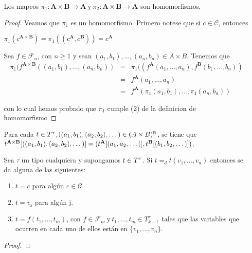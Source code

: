   \begin{lemma} \label{lemma_56}
    \PN Los mapeos $\pi_{1}: \mathbf{A} \times \mathbf{B} \rightarrow \mathbf{A} \ \text{y} \ \pi_{2}: \mathbf{A} \times
    \mathbf{B} \rightarrow \mathbf{A}$ son homomorfismos.
  \end{lemma}
  \begin{proof}
    Veamos que $\pi _{1}$ es un homomorfismo. Primero notese que si $c\in \mathcal{C}$, entonces

    $\displaystyle \pi _{1}(c^{\mathbf{A}\times \mathbf{B}})=\pi _{1}((c^{\mathbf{A}},c^{ \mathbf{B}}))=c^{\mathbf{A}} $

    Sea $f\in \mathcal{F}_{n}$, con $n\geq 1$ y sean $ (a_{1},b_{1}), \dotsc, (a_{n},b_{n})\in A\times B$. Tenemos que
    \[
      \begin{array}{ccl}
        \pi_{1}(f^{\mathbf{A} \times \mathbf{B}}((a_{1}, b_{1}), \dotsc, (a_{n}, b_{n})) &=& \pi_{1}((f^{\mathbf{A}}
          (a_{1}, \dotsc, a_{n}), f^{\mathbf{B}}(b_{1}, \dotsc, b_{n})) \\
        &=& f^{\mathbf{A}}(a_{1}, \dotsc, a_{n}) \\
        &=& f^{\mathbf{A}}(\pi_{1}(a_{1}, b_{1}), \dotsc, \pi_{1}(a_{n}, b_{n}))
      \end{array}
    \]

    con lo cual hemos probado que $\pi _{1}$ cumple (2) de la definicion de homomorfismo
  \end{proof}

  \begin{lemma} \label{lemma_57}
    \PN Para cada $t \in T^{\tau}, ((a_{1}, b_{1}), (a_{2}, b_{2}), \dotsc) \in (A \times B)^{\mathbb{N}}$, se tiene que
    $t^{\mathbf{A} \times \mathbf{B}}[((a_{1}, b_{1}), \linebreak (a_{2}, b_{2}), \dotsc)] = (t^{\mathbf{A}}[(a_{1},
    a_{2}, \dotsc)], t^{\mathbf{B}}[(b_{1}, b_{2}, \dotsc)])$.
  \end{lemma}

  \begin{lemma} \label{lemma_58}
    \PN Sea $\tau$ un tipo cualquiera y supongamos $t \in T^{\tau}$. Si $t =_{d} t(v_{1}, \dotsc, v_{n})$ entonces se da
    alguna de las siguientes:
    \begin{enumerate}
      \item $t = c$ para algún $c \in \mathcal{C}$.
      \item $t = v_{j}$ para algún j.
      \item $t = f(t_{1}, \dotsc, t_{m})$, con $f \in \mathcal{F}_{m} \ \text{y} \ t_{1}, \dotsc, t_{m} \in T_{k-1}^{\tau}$ tales
      que las variables que ocurren en cada uno de ellos están en $\{v_{1}, \dotsc, v_{n}\}$.
    \end{enumerate}
  \end{lemma}
  \begin{proof}
  \end{proof}

